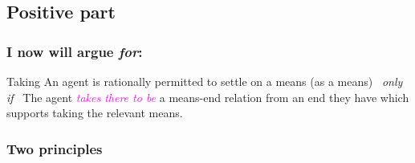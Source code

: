 \documentclass[noamssymb, compress, handout]{beamer} %
\begin{document}
\subsection{Positive part}
\label{sec:positive}

\begin{frame}
  \frametitle{I now will argue \emph{for}:}

  \begin{block}{Taking}
    An agent is rationally permitted to settle on a means (as a means)
    \newline
    \mbox{ }\hfill\emph{only if}\hfill\mbox{ }
    \newline
    The agent \textcolor{fuchsia}{\emph{takes there to be}} a means-end relation from an end they have which supports taking the relevant means.
  \end{block}
\end{frame}

\subsubsection{Two principles}
\label{sec:two-principles}
\end{document}
